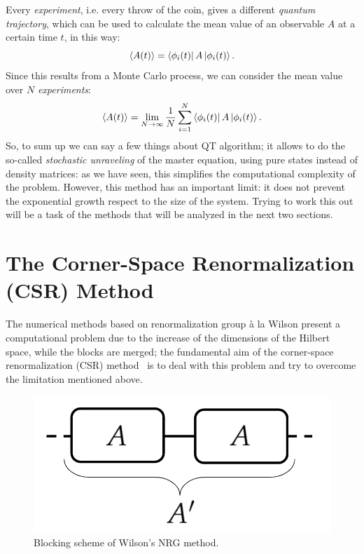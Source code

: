 Every \emph{experiment}, i.e. every throw of the coin, gives a different \emph{quantum trajectory}, which can be used to calculate the mean value of an observable $A$ at a certain time $t$, in this way:
\begin{equation}
    \langle A(t)\rangle = \bra{\phi_i(t)}A\ket{\phi_i(t)}.
\end{equation}
Since this results from a Monte Carlo process, we can consider the mean value over $N$ \emph{experiments}:
\begin{equation}
    \langle A(t)\rangle = \lim_{N\to\infty} \frac{1}{N}\sum_{i=1}^{N}\bra{\phi_i(t)}A\ket{\phi_i(t)}.
\end{equation}
So, to sum up we can say a few things about QT algorithm; it allows to do the so-called \emph{stochastic unraveling} of the master equation, using pure states instead of density matrices: as we have seen, this simplifies the computational complexity of the problem. However, this method has an important limit: it does not prevent the exponential growth respect to the size of the system. Trying to work this out will be a task of the methods that will be analyzed in the next two sections.

\section{The Corner-Space Renormalization (CSR) Method}
\label{chapter3_csr}
The numerical methods based on renormalization group à la Wilson present a computational problem due to the increase of the dimensions of the Hilbert space, while the blocks are merged; the fundamental aim of the corner-space renormalization (CSR) method~\cite{PhysRevLett.115.080604} is to deal with this problem and try to overcome the limitation mentioned above. 


\begin{figure}[H]
    \centering
    \includegraphics[scale=0.3]{Figures/wilson.png}
    \caption{Blocking scheme of Wilson's NRG method.}
    \label{fig:wilson}
\end{figure}


